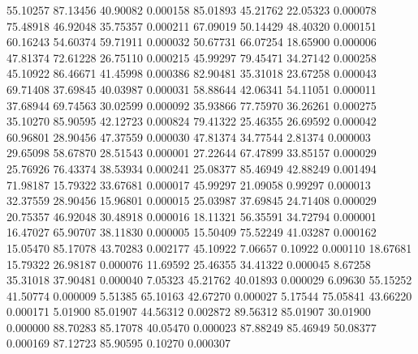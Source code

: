        55.10257       87.13456       40.90082       0.000158
       85.01893       45.21762       22.05323       0.000078
       75.48918       46.92048       35.75357       0.000211
       67.09019       50.14429       48.40320       0.000151
       60.16243       54.60374       59.71911       0.000032
       50.67731       66.07254       18.65900       0.000006
       47.81374       72.61228       26.75110       0.000215
       45.99297       79.45471       34.27142       0.000258
       45.10922       86.46671       41.45998       0.000386
       82.90481       35.31018       23.67258       0.000043
       69.71408       37.69845       40.03987       0.000031
       58.88644       42.06341       54.11051       0.000011
       37.68944       69.74563       30.02599       0.000092
       35.93866       77.75970       36.26261       0.000275
       35.10270       85.90595       42.12723       0.000824
       79.41322       25.46355       26.69592       0.000042
       60.96801       28.90456       47.37559       0.000030
       47.81374       34.77544        2.81374       0.000003
       29.65098       58.67870       28.51543       0.000001
       27.22644       67.47899       33.85157       0.000029
       25.76926       76.43374       38.53934       0.000241
       25.08377       85.46949       42.88249       0.001494
       71.98187       15.79322       33.67681       0.000017
       45.99297       21.09058        0.99297       0.000013
       32.37559       28.90456       15.96801       0.000015
       25.03987       37.69845       24.71408       0.000029
       20.75357       46.92048       30.48918       0.000016
       18.11321       56.35591       34.72794       0.000001
       16.47027       65.90707       38.11830       0.000005
       15.50409       75.52249       41.03287       0.000162
       15.05470       85.17078       43.70283       0.002177
       45.10922        7.06657        0.10922       0.000110
       18.67681       15.79322       26.98187       0.000076
       11.69592       25.46355       34.41322       0.000045
	8.67258       35.31018       37.90481       0.000040
	7.05323       45.21762       40.01893       0.000029
	6.09630       55.15252       41.50774       0.000009
	5.51385       65.10163       42.67270       0.000027
	5.17544       75.05841       43.66220       0.000171
	5.01900       85.01907       44.56312       0.002872
       89.56312       85.01907       30.01900       0.000000
       88.70283       85.17078       40.05470       0.000023
       87.88249       85.46949       50.08377       0.000169
       87.12723       85.90595        0.10270       0.000307
